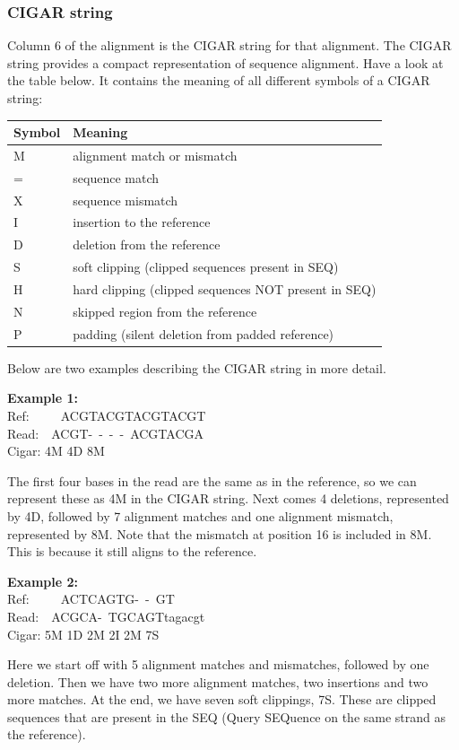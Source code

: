 \documentclass[11pt]{article}
\begin{document}
    \hypertarget{cigar-string}{%
\subsubsection{CIGAR string}\label{cigar-string}}

Column 6 of the alignment is the CIGAR string for that alignment. The
CIGAR string provides a compact representation of sequence alignment.
Have a look at the table below. It contains the meaning of all different
symbols of a CIGAR string:

\begin{longtable}[]{@{}ll@{}}
\hline
Symbol & Meaning\tabularnewline
\hline
\endhead
M & alignment match or mismatch\tabularnewline
= & sequence match\tabularnewline
X & sequence mismatch\tabularnewline
I & insertion to the reference\tabularnewline
D & deletion from the reference\tabularnewline
S & soft clipping (clipped sequences present in SEQ)\tabularnewline
H & hard clipping (clipped sequences NOT present in SEQ)\tabularnewline
N & skipped region from the reference\tabularnewline
P & padding (silent deletion from padded reference)\tabularnewline
\hline
\end{longtable}

Below are two examples describing the CIGAR string in more detail.

\textbf{Example 1:}\\
Ref:~~~~~ACGTACGTACGTACGT\\
Read:~~ACGT-~-~-~-~ACGTACGA\\
Cigar: 4M 4D 8M

The first four bases in the read are the same as in the reference, so we
can represent these as 4M in the CIGAR string. Next comes 4 deletions,
represented by 4D, followed by 7 alignment matches and one alignment
mismatch, represented by 8M. Note that the mismatch at position 16 is
included in 8M. This is because it still aligns to the reference.

\textbf{Example 2:}\\
Ref:~~~~~ACTCAGTG-~-~GT\\
Read:~~ACGCA-~TGCAGTtagacgt\\
Cigar: 5M 1D 2M 2I 2M 7S

Here we start off with 5 alignment matches and mismatches, followed by
one deletion. Then we have two more alignment matches, two insertions
and two more matches. At the end, we have seven soft clippings, 7S.
These are clipped sequences that are present in the SEQ (Query SEQuence
on the same strand as the reference).
\end{document}

